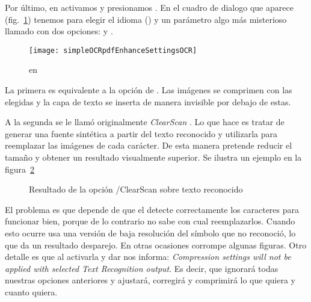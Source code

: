 \documentclass[%
	a5paper,
	10pt,
	twoside,
	openright,
	final,
]{memoir}
\begin{document}
{	Por último, en  activamos  y presionamos . En el cuadro de dialogo que aparece (fig.~\ref{fig:simpleOCRpdfEnhanceSettingsOCR}) tenemos para elegir el idioma () y un parámetro algo más misterioso llamado  con dos opciones:  y .

	\begin{figure}
		\centering
		\texttt{[image: simpleOCRpdfEnhanceSettingsOCR]}
		\caption[\texttt{Text Recognition Options >\ Edit} en \acrobat]{ en \acrobat\label{fig:simpleOCRpdfEnhanceSettingsOCR}}
	\end{figure}

	La primera es equivalente a la opción  de \abbyy. Las imágenes se comprimen con las  elegidas y la capa de texto se inserta de manera invisible por debajo de estas.

	A la segunda se le llamó originalmente \emph{ClearScan} \cite{ClearScan}. Lo que hace es tratar de generar una fuente sintética a partir del texto reconocido y utilizarla para reemplazar las imágenes de cada carácter. De esta manera pretende reducir el tamaño y obtener un resultado visualmente superior. Se ilustra un ejemplo en la figura~\ref{fig:simpleOCRpdfEnhanceGoodExamples}

	\begin{figure}
		\caption[\texttt{Editable Text and Images/ClearScan} en \acrobat]{Resultado de la opción /ClearScan sobre texto reconocido\label{fig:simpleOCRpdfEnhanceGoodExamples}}
	\end{figure}

	El problema es que depende de que el \ocr detecte correctamente los caracteres para funcionar bien, porque de lo contrario no sabe con cual reemplazarlos. Cuando esto ocurre usa una versión de baja resolución del símbolo que no reconoció, lo que da un resultado desparejo. En otras ocasiones corrompe algunas figuras. Otro detalle es que al activarla y dar  \acrobat nos informa: \emph{Compression settings will not be applied with selected Text Recognition output}. Es decir, que ignorará todas nuestras opciones anteriores y ajustará, corregirá y comprimirá lo que quiera y cuanto quiera.

}
\end{document}
